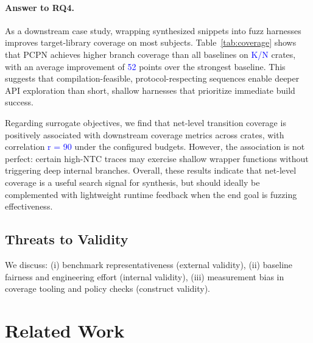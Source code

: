 \documentclass[sigconf]{acmart}
\begin{document}
\paragraph{Answer to RQ4.}
As a downstream case study, wrapping synthesized snippets into fuzz harnesses improves target-library coverage on most subjects. Table~\ref{tab:coverage} shows that PCPN achieves higher branch coverage than all baselines on \textcolor{blue}{K/N} crates, with an average improvement of \textcolor{blue}{52} points over the strongest baseline. This suggests that compilation-feasible, protocol-respecting sequences enable deeper API exploration than short, shallow harnesses that prioritize immediate build success.

Regarding surrogate objectives, we find that net-level transition coverage is positively associated with downstream coverage metrics across crates, with correlation \textcolor{blue}{r = 90} under the configured budgets. However, the association is not perfect: certain high-NTC traces may exercise shallow wrapper functions without triggering deep internal branches. Overall, these results indicate that net-level coverage is a useful search signal for synthesis, but should ideally be complemented with lightweight runtime feedback when the end goal is fuzzing effectiveness.




\subsection{Threats to Validity}
\label{sec:evaluation:threats}
We discuss:
(i) benchmark representativeness (external validity),
(ii) baseline fairness and engineering effort (internal validity),
(iii) measurement bias in coverage tooling and policy checks (construct validity).


\section{Related Work}
\label{sec:related}
\end{document}
